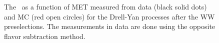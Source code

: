 \begin{figure}[!hbtp]
\caption{
 The \routin\, as a function of MET measured from data (black solid dots) 
and MC (red open circles) for the Drell-Yan processes after the WW preselections. 
The measurements in data are done using the opposite flavor subtraction method. }
\label{fig:dyr_hww}
\end{figure}

